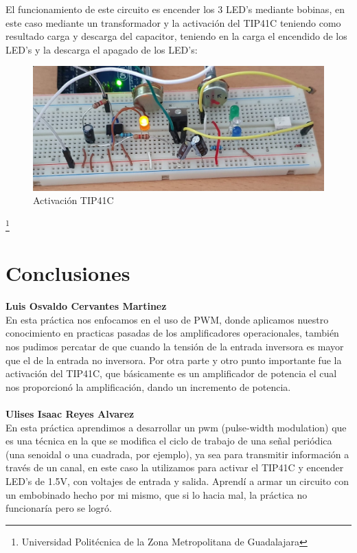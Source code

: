 \documentclass[10pt,a4paper]{article}
\begin{document}
El funcionamiento de este circuito es encender los 3 LED's mediante bobinas, en este caso mediante un transformador y la activación del TIP41C teniendo como resultado carga y descarga del capacitor, teniendo en la carga el encendido de los LED's y la descarga el apagado de los LED's:
\begin{figure}[hbtp]
\centering
\includegraphics[scale=0.3]{Pictures/TIP.jpeg}
\caption{Activación TIP41C}
\end{figure}

\footnote{Universidad Politécnica de la Zona Metropolitana de Guadalajara}

\newpage
\section{Conclusiones}
\textbf{Luis Osvaldo Cervantes Martinez}\\
En esta práctica nos enfocamos en el uso de PWM, donde aplicamos nuestro conocimiento en practicas pasadas de los amplificadores operacionales, también nos pudimos percatar de que cuando la tensión de la entrada inversora es mayor que el de la entrada no inversora. Por otra parte y otro punto importante fue la activación del TIP41C, que básicamente es un amplificador de potencia el cual nos proporcionó la amplificación, dando un incremento de potencia.\\\\

\textbf{Ulises Isaac Reyes Alvarez}\\
En esta práctica aprendimos a desarrollar un pwm (pulse-width modulation) que es  una técnica en la que se modifica el ciclo de trabajo de una señal periódica (una senoidal o una cuadrada, por ejemplo), ya sea para transmitir información a través de un canal, en este caso la utilizamos para activar el TIP41C y encender LED's de 1.5V, con voltajes de entrada y salida. Aprendí a armar un circuito con un embobinado hecho por mi mismo, que si lo hacia mal, la práctica no funcionaría pero se logró. 
\end{document}
